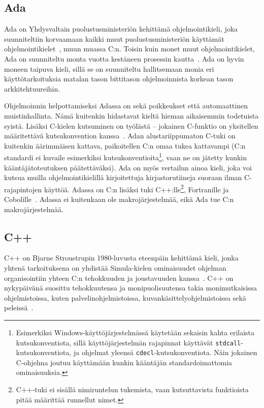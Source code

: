 \subsection{Ada}

Ada on Yhdysvaltain puolustusministeriön kehittämä ohjelmointikieli, joka
suunniteltiin korvaamaan kaikki muut puolustusministeriön käyttämät
ohjelmointikielet~\citep{adahistory}, muun muassa C:n. Toisin kuin monet muut
ohjelmointikielet, Ada on suunniteltu monta vuotta kestäneen prosessin
kautta~\citep[s.~121]{theoryandpractice}. Ada on hyvin moneen taipuva kieli,
sillä se on suunniteltu hallitsemaan monia eri käyttötarkoituksia matalan tason
bittitason ohjelmoinnista korkean tason arkkitehtuureihin.

Ohjelmoinnin helpottamiseksi Adassa on sekä poikkeukset että automaattinen
muistinhallinta. Nämä kuitenkin hidastavat kieltä hieman aikaisemmin todetuista
syistä. Lisäksi C-kielen kutsuminen on työlästä  -- jokainen C-funktio on
yksitellen määritettävä kutsukonvention
kanssa~\citep[s.~471]{ADA12}. Adan alustariippumaton C-tuki on kuitenkin
äärimmäisen kattava, paikoitellen C:n omaa tukea kattavampi (C:n standardi ei
kuvaile esimerkiksi kutsukonventioita\footnote{Esimerkiksi
Windows-käyttöjärjestelmässä käytetään sekaisin kahta erilaista
kutsukonventiota, sillä käyttöjärjestelmän rajapinnat käyttävät
\texttt{stdcall}-kutsukonventiota, ja ohjelmat yleensä
\texttt{cdecl}-kutsukonventiota. Näin jokainen C-ohjelma joutuu käyttämään
kunkin kääntäjän standardoimattomia ominaisuuksia.}, vaan ne on jätetty kunkin
kääntäjätoteutuksen päätettäväksi). Ada on myös vertailun ainoa kieli, joka voi
kutsua muilla ohjelmointikielillä kirjoitettuja kirjastorutiineja suoraan ilman
C-rajapintojen käyttöä. Adassa on C:n lisäksi tuki C++:lle\footnote{C++-tuki ei
sisällä nimiruntelun tukemista, vaan kutsuttavista funktioista pitää määrittää
runnellut nimet.}, Fortranille ja Cobolille~\citep[s.~585]{ADA12}. Adassa ei
kuitenkaan ole makrojärjestelmää, eikä Ada tue C:n makrojärjestelmää.

\subsection{C++}

C++ on Bjarne Stroustrupin 1980-luvusta eteenpäin kehittämä kieli, jonka
yhtenä tarkoituksena on yhdistää Simula-kielen ominaisuudet ohjelman
organisointiin yhteen C:n tehokkuuden ja joustavuuden
kanssa~\citep{cpphistory}. C++ on nykypäivänä suosittu tehokkuutensa ja
monipuolisuutensa takia monimutkaisissa ohjelmistoissa, kuten
palvelinohjelmistoissa, kuvankäsittelyohjelmistoissa sekä
peleissä~\citep{cppapps}.

